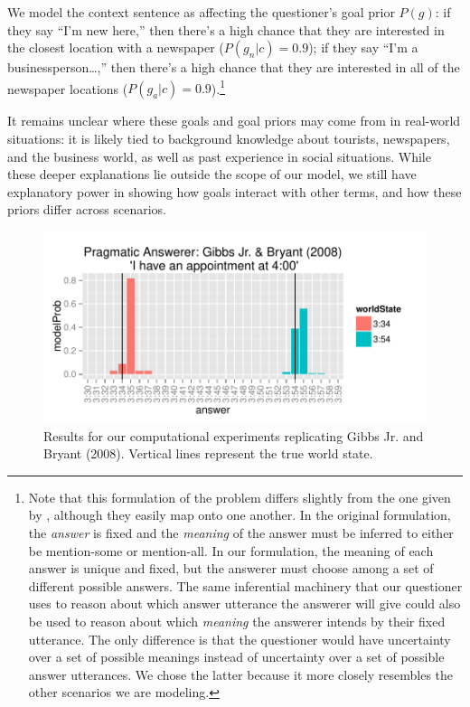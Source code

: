 \documentclass[12pt, floatsintext, jou]{apa6}
\begin{document}
We model the context sentence as affecting the questioner's goal prior $P(g)$: if they say ``I'm new here,'' then there's a high chance that they are interested in the closest location with a newspaper ($P(g_n | c) = 0.9$); if they say ``I'm a businessperson\dots,'' then there's a high chance that they are interested in all of the newspaper locations ($P(g_a | c) = 0.9$).\footnote{Note that this formulation of the problem differs slightly from the one given by , although they easily map onto one another. In the original formulation, the \emph{answer} is fixed and the \emph{meaning} of the answer must be inferred to either be mention-some or mention-all. In our formulation, the meaning of each answer is unique and fixed, but the answerer must choose among a set of different possible answers. The same inferential machinery that our questioner uses to reason about which answer utterance the answerer will give could also be used to reason about which \emph{meaning} the answerer intends by their fixed utterance. The only difference is that the questioner would have uncertainty over a set of possible meanings instead of uncertainty over a set of possible answer utterances. We chose the latter because it more closely resembles the other scenarios we are modeling.}

It remains unclear where these goals and goal priors may come from in real-world situations: it is likely tied to background knowledge about tourists, newspapers, and the business world, as well as past experience in social situations. While these deeper explanations lie outside the scope of our model, we still have explanatory power in showing how goals interact with other terms, and how these priors differ across scenarios. 

 \begin{figure}[t!]
\begin{center}
\includegraphics[scale = 1]{timeExpResults.pdf}
\end{center}
\vspace{-.25cm}
\caption{Results for our computational experiments replicating Gibbs Jr. and Bryant (2008). Vertical lines represent the true world state.}
\label{fig:timeExperimentResults}
\end{figure}
\end{document}
